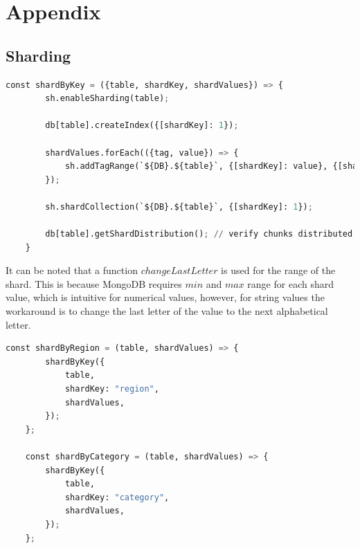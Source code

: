 \documentclass{article}
\begin{document}
    \section{Appendix}
    \subsection{Sharding}\label{subsec:appendix-sharding}
    \begin{lstlisting}[language=Python, caption=General sharding function]
    const shardByKey = ({table, shardKey, shardValues}) => {
        sh.enableSharding(table);
    
        db[table].createIndex({[shardKey]: 1});
    
        shardValues.forEach(({tag, value}) => {
            sh.addTagRange(`${DB}.${table}`, {[shardKey]: value}, {[shardKey]: changeLastLetter(value)}, tag);
        });
    
        sh.shardCollection(`${DB}.${table}`, {[shardKey]: 1});
    
        db[table].getShardDistribution(); // verify chunks distributed on shards
    }
    \end{lstlisting}
    It can be noted that a function $changeLastLetter$ is used for the range of the shard. This is because MongoDB requires $min$ and $max$ range for each shard value, which is intuitive for numerical values, however, for string values the workaround is to change the last letter of the value to the next alphabetical letter.
    \begin{lstlisting}[language=Python, caption=Sharding per region and category]
    const shardByRegion = (table, shardValues) => {
        shardByKey({
            table,
            shardKey: "region",
            shardValues,
        });
    };
    
    const shardByCategory = (table, shardValues) => {
        shardByKey({
            table,
            shardKey: "category",
            shardValues,
        });
    };
    
    \end{lstlisting}
\end{document}
